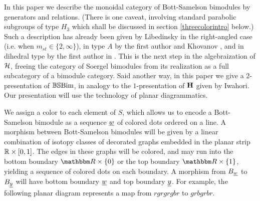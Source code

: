 In this paper we describe the monoidal category of Bott-Samelson bimodules by
generators and relations. (There is one caveat, involving standard parabolic subgroups of type $H_3$ which shall be discussed in section \ref{threecolorintro} below.) Such a description has already been given by Libedinsky
\cite{LibRA} in the right-angled case (i.e. when $m_{st} \in \{2,\infty\}$), in type $A$ by the first author and Khovanov \cite{EKh}, and in dihedral type by the first author in
\cite{EDihedral}. This is the next step in the algebraization of ${\mathcal{H}}$, freeing the category of Soergel bimodules from its realization as a full subcategory of a bimodule category. Said
another way, in this paper we give a $2$-presentation of $\mathbb{BS}\textrm{Bim}$, in analogy to the $1$-presentation of ${\mathbf H}$ given by Iwahori. Our presentation will use the technology of planar
diagrammatics.

We assign a color to each element of $S$, which allows us to encode a Bott-Samelson bimodule as a sequence $\underline{w}$ of colored dots ordered on
a line. A morphism between Bott-Samelson bimodules will be given by a linear combination of isotopy classes of decorated graphs embedded in the planar strip ${\mathbb{R}} \times [0,1]$. The edges
in these graphs will be colored, and may run into the bottom boundary $\R \times \{0\}$ or the top boundary $\R \times \{1\}$, yielding a sequence of colored dots on each boundary. A
morphism from $B_{\underline{w}}$ to $B_{\underline{y}}$ will have bottom boundary $\underline{w}$ and top boundary $\underline{y}$. For example, the following planar diagram
represents a map from $rgrgrgbr$ to $grbgrbr$.

